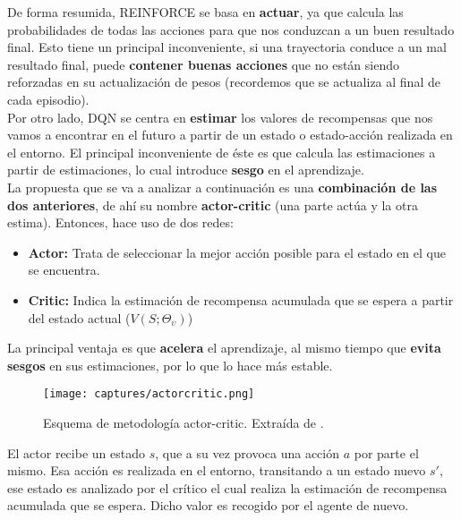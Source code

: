 \documentclass[11pt,fleqn]{book} %
\begin{document}
De forma resumida, REINFORCE se basa en \textbf{actuar}, ya que calcula las probabilidades de todas las acciones para que nos conduzcan a un buen resultado final. Esto tiene un principal inconveniente, si una trayectoria conduce a un mal resultado final, puede \textbf{contener buenas acciones} que no están siendo reforzadas en su actualización de pesos (recordemos que se actualiza al final de cada episodio). \\

Por otro lado, DQN se centra en \textbf{estimar} los valores de recompensas que nos vamos a encontrar en el futuro a partir de un estado o estado-acción realizada en el entorno. El principal inconveniente de éste es que calcula las estimaciones a partir de estimaciones, lo cual introduce \textbf{sesgo} en el aprendizaje. \\

La propuesta que se va a analizar a continuación es una \textbf{combinación de las dos anteriores}, de ahí su nombre \textbf{actor-critic} (una parte actúa y la otra estima). Entonces, hace uso de dos redes: \\

\begin{itemize}
	\item \textbf{Actor:} Trata de seleccionar la mejor acción posible para el estado en el que se encuentra.\\
	
	\item \textbf{Critic:} Indica la estimación de recompensa acumulada que se espera a partir del estado actual ($V(S;\Theta_\upsilon)$) \\
\end{itemize}

La principal ventaja es que \textbf{acelera} el aprendizaje, al mismo tiempo que \textbf{evita sesgos} en sus estimaciones, por lo que lo hace más estable.

\begin{figure}[H]
	\centering\texttt{[image: captures/actorcritic.png]}
	\caption{Esquema de metodología actor-critic. Extraída de \cite{article:RLromero}.}
	\label{fig:actorcritic} %
\end{figure}

El actor recibe un estado $s$, que a su vez provoca una acción $a$ por parte el mismo. Esa acción es realizada en el entorno, transitando a un estado nuevo $s'$, ese estado es analizado por el crítico el cual realiza la estimación de recompensa acumulada que se espera. Dicho valor es recogido por el agente de nuevo. \\
\end{document}
